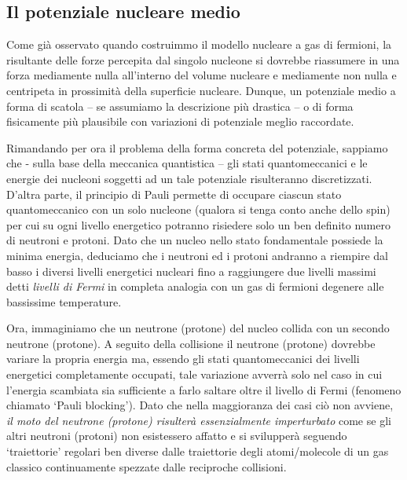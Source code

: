 \subsection{Il potenziale nucleare medio}\label{sec:potenziale-nucleare-medio}

Come già osservato quando costruimmo il modello nucleare a gas di fermioni, la risultante delle forze percepita dal singolo nucleone si dovrebbe riassumere in una forza mediamente nulla all’interno del volume nucleare e mediamente non nulla e centripeta in prossimità della superficie nucleare.
Dunque, un potenziale medio a forma di scatola – se assumiamo la descrizione più drastica – o di forma fisicamente più plausibile con variazioni di potenziale meglio raccordate.

Rimandando per ora il problema della forma concreta del potenziale, sappiamo che - sulla base della meccanica quantistica – gli stati quantomeccanici e le energie dei nucleoni soggetti ad un tale potenziale risulteranno discretizzati.
D’altra parte, il principio di Pauli permette di occupare ciascun stato quantomeccanico con un solo nucleone (qualora si tenga conto anche dello spin) per cui su ogni livello energetico potranno risiedere solo un ben definito numero di neutroni e protoni.
Dato che un nucleo nello stato fondamentale possiede la minima energia, deduciamo che i neutroni ed i protoni andranno a riempire dal basso i diversi livelli energetici nucleari fino a raggiungere due livelli massimi detti \emph{livelli di Fermi} in completa analogia con un gas di fermioni degenere alle bassissime temperature.

Ora, immaginiamo che un neutrone (protone) del nucleo collida con un secondo neutrone (protone).
A seguito della collisione il neutrone (protone) dovrebbe variare la propria energia ma, essendo gli stati quantomeccanici dei livelli energetici completamente occupati, tale variazione avverrà solo nel caso in cui l’energia scambiata sia sufficiente a farlo saltare oltre il livello di Fermi (fenomeno chiamato ‘Pauli blocking’).
Dato che nella maggioranza dei casi ciò non avviene, \emph{il moto del neutrone (protone) risulterà essenzialmente imperturbato} come se gli altri neutroni (protoni) non esistessero affatto e si svilupperà seguendo ‘traiettorie’ regolari ben diverse dalle traiettorie degli atomi/molecole di un gas classico continuamente spezzate dalle reciproche collisioni.

